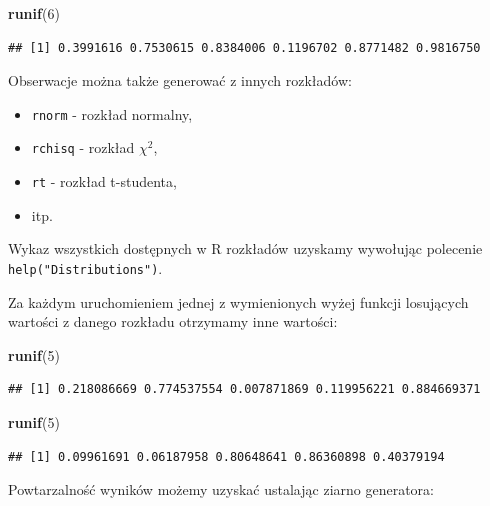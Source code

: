 \documentclass[]{book}
\newenvironment{Shaded}{\begin{snugshade}}{\end{snugshade}}
\newcommand{\KeywordTok}[1]{\textcolor[rgb]{0.13,0.29,0.53}{\textbf{#1}}}
\newcommand{\DecValTok}[1]{\textcolor[rgb]{0.00,0.00,0.81}{#1}}
\newcommand{\NormalTok}[1]{#1}
\providecommand{\tightlist}{%
  \setlength{\itemsep}{0pt}\setlength{\parskip}{0pt}}
\begin{document}
\begin{Shaded}
\begin{Highlighting}[]
\KeywordTok{runif}\NormalTok{(}\DecValTok{6}\NormalTok{)}
\end{Highlighting}
\end{Shaded}

\begin{verbatim}
## [1] 0.3991616 0.7530615 0.8384006 0.1196702 0.8771482 0.9816750
\end{verbatim}

Obserwacje można także generować z innych rozkładów:

\begin{itemize}
\tightlist
\item
  \texttt{rnorm} - rozkład normalny,
\item
  \texttt{rchisq} - rozkład \(\chi^2\),
\item
  \texttt{rt} - rozkład t-studenta,
\item
  itp.
\end{itemize}

Wykaz wszystkich dostępnych w R rozkładów uzyskamy wywołując polecenie
\texttt{help("Distributions")}.

Za każdym uruchomieniem jednej z wymienionych wyżej funkcji losujących
wartości z danego rozkładu otrzymamy inne wartości:

\begin{Shaded}
\begin{Highlighting}[]
\KeywordTok{runif}\NormalTok{(}\DecValTok{5}\NormalTok{)}
\end{Highlighting}
\end{Shaded}

\begin{verbatim}
## [1] 0.218086669 0.774537554 0.007871869 0.119956221 0.884669371
\end{verbatim}

\begin{Shaded}
\begin{Highlighting}[]
\KeywordTok{runif}\NormalTok{(}\DecValTok{5}\NormalTok{)}
\end{Highlighting}
\end{Shaded}

\begin{verbatim}
## [1] 0.09961691 0.06187958 0.80648641 0.86360898 0.40379194
\end{verbatim}

Powtarzalność wyników możemy uzyskać ustalając ziarno generatora:
\end{document}
